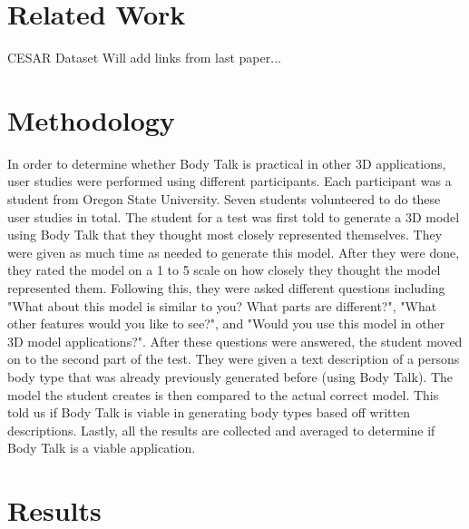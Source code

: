 \documentclass[journal]{vgtc}                %
\begin{document}
\section{Related Work}
CESAR Dataset
Will add links from last paper...
\section{Methodology}
\noindent In order to determine whether Body Talk is practical in other 3D applications, user studies were performed using different participants. Each participant was a student from Oregon State University. Seven students volunteered to do these user studies in total. \newline \newline
\noindent The student for a test was first told to generate a 3D model using Body Talk that they thought most closely represented themselves. They were given as much time as needed to generate this model. After they were done, they rated the model on a 1 to 5 scale on how closely they thought the model represented them. Following this, they were asked different questions including "What about this model is similar to you? What parts are different?", "What other features would you like to see?", and "Would you use this model in other 3D model applications?".\newline \newline
\noindent After these questions were answered, the student moved on to the second part of the test. They were given a text description of a persons body type that was already previously generated before (using Body Talk). The model the student creates is then compared to the actual correct model. This told us if Body Talk is viable in generating body types based off written descriptions. \newline\newline
\noindent Lastly, all the results are collected and averaged to determine if Body Talk is a viable application.  


\section{Results}
\end{document}
